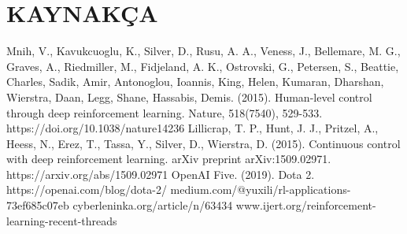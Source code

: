 \documentclass[12pt, a4paper]{article}
\begin{document}
		\section{KAYNAKÇA} 
	Mnih, V., Kavukcuoglu, K., Silver, D., Rusu, A. A., Veness, J., Bellemare, M. G., Graves, A., Riedmiller, M., Fidjeland, A. K., Ostrovski, G., Petersen, S., Beattie, Charles, Sadik, Amir, Antonoglou, Ioannis, King, Helen, Kumaran, Dharshan, Wierstra, Daan, Legg, Shane, Hassabis, Demis. (2015). Human-level control through deep reinforcement learning. Nature, 518(7540), 529-533. https://doi.org/10.1038/nature14236
	Lillicrap, T. P., Hunt, J. J., Pritzel, A., Heess, N., Erez, T., Tassa, Y., Silver, D., Wierstra, D. (2015). Continuous control with deep reinforcement learning. arXiv preprint arXiv:1509.02971. https://arxiv.org/abs/1509.02971
	OpenAI Five. (2019). Dota 2. https://openai.com/blog/dota-2/
	medium.com/@yuxili/rl-applications-73ef685c07eb
	cyberleninka.org/article/n/63434
	www.ijert.org/reinforcement-learning-recent-threads
	
\end{document}
